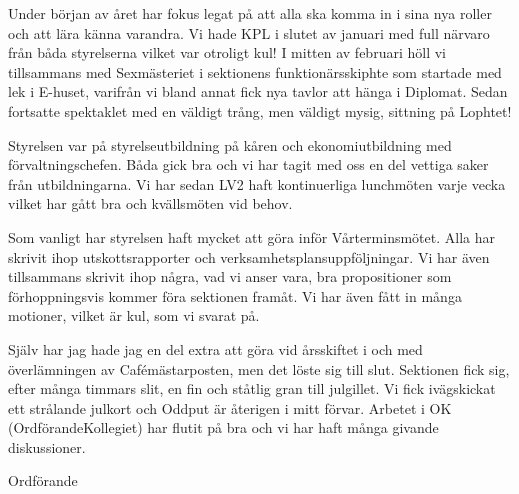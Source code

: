 \documentclass[../_main/handlingar.tex]{subfiles}
\begin{document}
Under början av året har fokus legat på att alla ska komma in i sina nya roller och att lära känna varandra. Vi hade KPL i slutet av januari med full närvaro från båda styrelserna vilket var otroligt kul! I mitten av februari höll vi tillsammans med Sexmästeriet i sektionens funktionärsskiphte som startade med lek i E-huset, varifrån vi bland annat fick nya tavlor att hänga i Diplomat. Sedan fortsatte spektaklet med en väldigt trång, men väldigt mysig, sittning på Lophtet!

Styrelsen var på styrelseutbildning på kåren och ekonomiutbildning med förvaltningschefen. Båda gick bra och vi har tagit med oss en del vettiga saker från utbildningarna. Vi har sedan LV2 haft kontinuerliga lunchmöten varje vecka vilket har gått bra och kvällsmöten vid behov.

Som vanligt har styrelsen haft mycket att göra inför Vårterminsmötet. Alla har skrivit ihop utskottsrapporter och verksamhetsplansuppföljningar. Vi har även tillsammans skrivit ihop några, vad vi anser vara, bra propositioner som förhoppningsvis kommer föra sektionen framåt. Vi har även fått in många motioner, vilket är kul, som vi svarat på.

Själv har jag hade jag en del extra att göra vid årsskiftet i och med överlämningen av Cafémästarposten, men det löste sig till slut. Sektionen fick sig, efter många timmars slit, en fin och ståtlig gran till julgillet. Vi fick ivägskickat ett strålande julkort och Oddput är återigen i mitt förvar. Arbetet i OK (OrdförandeKollegiet) har flutit på bra och vi har haft många givande diskussioner.
\begin{signatures}{1}
    \mvh
    \signature{Daniel Bakic}{Ordförande}
\end{signatures}
\end{document}
